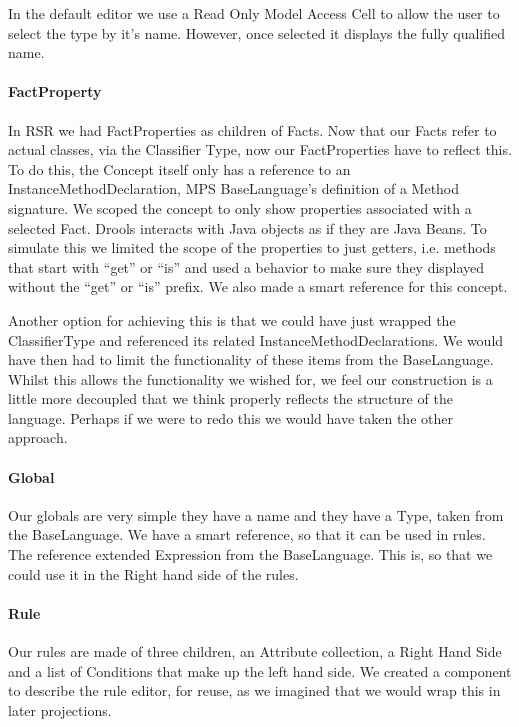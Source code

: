 In the default editor we use a Read Only Model Access Cell to allow the user to select the type by it's name.
However, once selected it displays the fully qualified name.

\paragraph{FactProperty} In RSR we had FactProperties as children of Facts.
Now that our Facts refer to actual classes, via the Classifier Type, now our FactProperties have to reflect this.
To do this, the Concept itself only has a reference to an InstanceMethodDeclaration, MPS BaseLanguage's definition of a Method signature.
We scoped the concept to only show properties associated with a selected Fact.
Drools interacts with Java objects as if they are Java Beans.
To simulate this we limited the scope of the properties to just getters, i.e. methods that start with ``get'' or ``is'' and used a behavior to make sure they displayed without the ``get'' or ``is'' prefix.
We also made a smart reference for this concept.

Another option for achieving this is that we could have just wrapped the ClassifierType and referenced its related InstanceMethodDeclarations.
We would have then had to limit the functionality of these items from the BaseLanguage.
Whilst this allows the functionality we wished for, we feel our construction is a little more decoupled that we think properly reflects the structure of the language.
Perhaps if we were to redo this we would have taken the other approach.

\paragraph{Global} Our globals are very simple they have a name and they have a Type, taken from the BaseLanguage.
We have a smart reference, so that it can be used in rules.
The reference extended Expression from the BaseLanguage.
This is, so that we could use it in the Right hand side of the rules.

\paragraph{Rule} Our rules are made of three children, an Attribute collection, a Right Hand Side and a list of Conditions that make up the left hand side.
We created a component to describe the rule editor, for reuse, as we imagined that we would wrap this in later projections.

